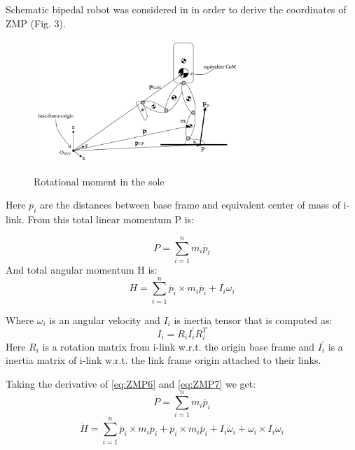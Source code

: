 \documentclass[12pt,a4paper]{report}
\begin{document}
		Schematic bipedal robot was considered in \cite{dekker2009zero} in order to derive the coordinates of ZMP (Fig. 3).

		\begin{figure}[h!]
			\vspace{-0.2cm}
			\centering
			{\includegraphics[width=0.7\textwidth]{3}}
			\caption{Rotational moment in the sole \cite{dekker2009zero}}
			\label{fig:3}
			\vspace{-0.1cm}
		\end{figure}

		Here $p_i$ are the distances between base frame and equivalent center of mass of i-link. From this total linear momentum P is:
	
		\begin{equation} \label{eq:ZMP6}
			P = \sum^n_{i=1}{m_i \dot{p_i}}
		\end{equation}
		And total angular momentum H is:
		\begin{equation} \label{eq:ZMP7}
			H = \sum^n_{i=1}{\dot{p_i} \times m_i \dot{p_i} + I_i \omega_i}
		\end{equation}

		Where $\omega_i$ is an angular velocity and $I_i$ is inertia tensor that is computed as:
		\begin{equation} \label{eq:ZMP8}
			I_i = R_i I_i^{\prime} R_i^T
		\end{equation}
		Here $R_i$ is a rotation matrix from i-link w.r.t. the origin base frame and $I_i^{\prime}$ is a inertia matrix of i-link w.r.t. the link frame origin attached to their links.

		Taking the derivative of \ref{eq:ZMP6} and \ref{eq:ZMP7} we get:
		\begin{equation} \label{eq:ZMP9}
			\dot{P} = \sum^n_{i=1}{m_i \ddot{p_i}}
		\end{equation}
		\begin{equation} \label{eq:ZMP10}
			\dot{H} = \sum^n_{i=1}{\ddot{p_i} \times m_i \dot{p_i} + \dot{p_i} \times m_i \ddot{p_i} + I_i \dot{\omega_i}} + \omega_i \times I_i \omega_i
		\end{equation}
\end{document}

